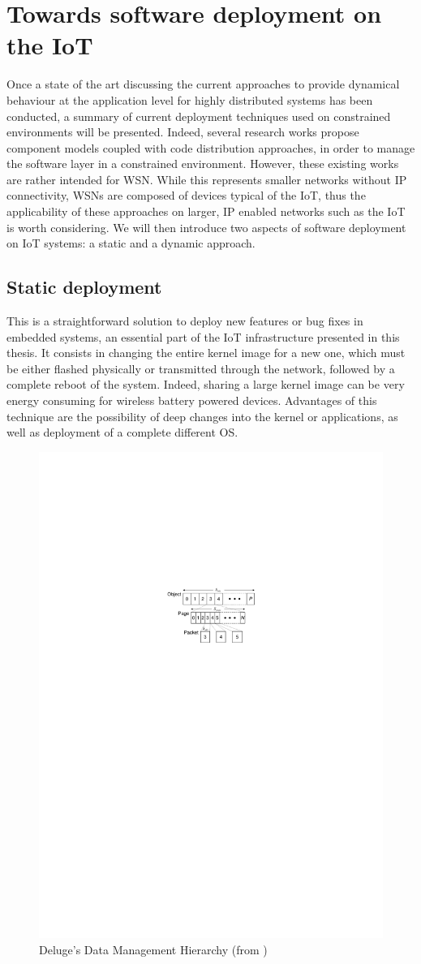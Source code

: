 \section{Towards software deployment on the IoT}
Once a state of the art discussing the current approaches to provide dynamical behaviour at the application level for highly distributed systems has been conducted, a summary of current deployment techniques used on constrained environments will be presented.
Indeed, several research works propose component models coupled with code distribution approaches, in order to manage the software layer in a constrained environment.
However, these existing works are rather intended for WSN.
While this represents smaller networks without IP connectivity, WSNs are composed of devices typical of the IoT, thus the applicability of these approaches on larger, IP enabled networks such as the IoT is worth considering.
We will then introduce two aspects of software deployment on IoT systems: a static and a dynamic approach.

\subsection{Static deployment}
\label{subsec:deluge}
This is a straightforward solution to deploy new features or bug fixes in embedded systems, an essential part of the IoT infrastructure presented in this thesis.
It consists in changing the entire kernel image for a new one, which must be either flashed physically or transmitted through the network, followed by a complete reboot of the system.
Indeed, sharing a large kernel image can be very energy consuming for wireless battery powered devices.
Advantages of this technique are the possibility of deep changes into the kernel or applications, as well as deployment of a complete different OS.

\begin{figure}[htb]
	\centering
	\includegraphics[width=0.5 \columnwidth]{chapters/stateOfTheArt.images/delugePages.pdf}
	\caption{Deluge's Data Management Hierarchy (from  \cite{hui2004dynamic}) \label{fig:DelugePages}} 
\end{figure}

